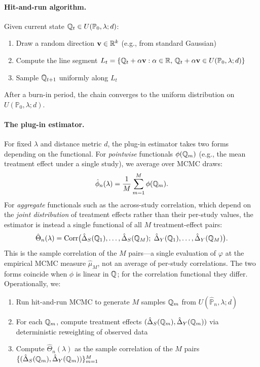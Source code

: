 \documentclass{article}
\newcommand{\PP}{\mathbb{P}}
\begin{document}
\paragraph{Hit-and-run algorithm.}
Given current state $\Q_t \in U(\PP_0, \lambda; d)$:
\begin{enumerate}
    \item Draw a random direction $\mathbf{v} \in \mathbb{R}^k$ (e.g., from standard Gaussian)
    \item Compute the line segment $L_t = \{\Q_t + \alpha \bv : \alpha \in \R, \, \Q_t + \alpha \bv \in U(\PP_0, \lambda; d)\}$
    \item Sample $\mathbb{Q}_{t+1}$ uniformly along $L_t$
\end{enumerate}
After a burn-in period, the chain converges to the uniform distribution on $U(\PP_0, \lambda; d)$.

\paragraph{The plug-in estimator.}
For fixed $\lambda$ and distance metric $d$, the plug-in estimator takes two forms depending
on the functional. For \emph{pointwise} functionals $\phi(\mathbb{Q}_m)$ (e.g., the mean treatment
effect under a single study), we average over MCMC draws:
\[
    \hat{\phi}_n(\lambda) = \frac{1}{M}\sum_{m=1}^M \phi(\mathbb{Q}_m).
\]
For \emph{aggregate} functionals such as the across-study correlation, which depend on the
\emph{joint distribution} of treatment effects rather than their per-study values, the estimator
is instead a single functional of all $M$ treatment-effect pairs:
\[
    \hat{\Theta}_n(\lambda) = \operatorname{Corr}\!\big(\hat{\Delta}_S(\mathbb{Q}_1),\ldots,\hat{\Delta}_S(\mathbb{Q}_M);\;
    \hat{\Delta}_Y(\mathbb{Q}_1),\ldots,\hat{\Delta}_Y(\mathbb{Q}_M)\big).
\]
This is the sample correlation of the $M$ pairs---a single evaluation of $\varphi$ at
the empirical MCMC measure $\hat\mu_M$, not an average of per-study correlations.
The two forms coincide when $\phi$ is linear in $\mathbb{Q}$; for the correlation functional they differ.
Operationally, we:
\begin{enumerate}
    \item Run hit-and-run MCMC to generate $M$ samples $\mathbb{Q}_m$ from $U(\hat{\PP}_n, \lambda; d)$
    \item For each $\mathbb{Q}_m$, compute treatment effects $(\hat{\Delta}_S(\mathbb{Q}_m), \hat{\Delta}_Y(\mathbb{Q}_m))$
          via deterministic reweighting of observed data
    \item Compute $\hat{\Theta}_n(\lambda)$ as the sample correlation
          of the $M$ pairs $\{(\hat{\Delta}_S(\mathbb{Q}_m), \hat{\Delta}_Y(\mathbb{Q}_m))\}_{m=1}^M$
\end{enumerate}
\end{document}
